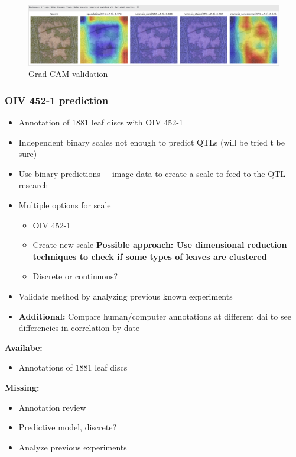 \documentclass[english]{article}
\begin{document}
\begin{figure}
	\centering
	\includegraphics[width=0.8\linewidth]{gc_hf_seg_sen_high.png}
	\caption*{Grad-CAM validation}\label{fig:gradcamval}
\end{figure}

\subsubsection{OIV 452-1 prediction}

\begin{itemize}
	\item Annotation of 1881 leaf discs with OIV 452-1
	\item Independent binary scales not enough to predict QTLs (will be tried t be sure)
	\item Use binary predictions + image data to create a scale to feed to the QTL research
	\item Multiple options for scale
	      \begin{itemize}
		      \item OIV 452-1
		      \item Create new scale \textbf{Possible approach: Use dimensional reduction techniques to check if some types of leaves are clustered}
		      \item Discrete or continuous?
	      \end{itemize}
	\item Validate method by analyzing previous known experiments
	\item \textbf{Additional:} Compare human/computer annotations at different dai to see differencies in correlation by date
\end{itemize}

\textbf{Availabe:}
\begin{itemize}
	\item Annotations of 1881 leaf discs
\end{itemize}
\textbf{Missing:}
\begin{itemize}
	\item Annotation review
	\item Predictive model, discrete?
	\item Analyze previous experiments
\end{itemize}
\end{document}
